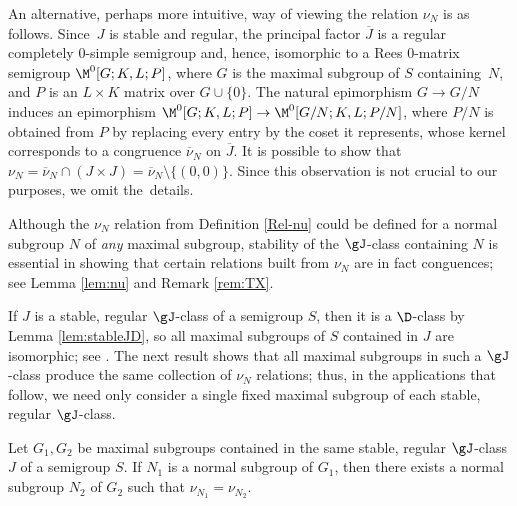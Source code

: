 An alternative, perhaps more intuitive, way of viewing the relation $\nu_N$ is
as follows.
Since~$J$ is stable and regular, the principal factor $\overline{J}$ is a regular
completely $0$-simple semigroup and, hence, isomorphic to a Rees $0$-matrix
semigroup $\M^0[G;K,L; P]$, where $G$ is the maximal subgroup of $S$ containing~$N$, and $P$ is an $L\times K$ matrix over $G\cup\{0\}$.  The natural
epimorphism $G\rightarrow G/N$ induces an epimorphism ${\M^0[G;K,L;P]\rightarrow
\M^0[G/N;K,L;P/N]}$, where $P/N$ is obtained from $P$ by replacing every entry by
the coset it represents, whose kernel corresponds to a congruence
$\overline{\nu}_N$ on $\overline{J}$.  It is possible to show that
$\nu_N=\overline{\nu}_N\cap(J\times J)=\overline{\nu}_N\setminus\{(0,0)\}$.  Since this observation is not crucial to our purposes, we omit the~details.

Although the $\nu_N$ relation from Definition \ref{Rel-nu} could be defined for a normal subgroup $N$ of \emph{any} maximal subgroup, stability of the $\gJ$-class containing $N$ is essential in showing that certain relations built from $\nu_N$ are in fact conguences; see Lemma \ref{lem:nu} and Remark \ref{rem:TX}.

%
If $J$ is a stable, regular $\gJ$-class of a semigroup $S$, then it is a $\D$-class by Lemma \ref{lem:stableJD}, so all maximal subgroups of $S$ contained in $J$ are isomorphic; see \cite[Proposition 2.3.6]{Howie}.  The next result shows that all maximal subgroups in such a $\gJ$-class produce the same collection of $\nu_N$ relations; thus, in the applications that follow, we need only consider a single fixed maximal subgroup of each stable, regular $\gJ$-class.

\begin{lemma}\label{lem:G1G2}
Let $G_1,G_2$ be maximal subgroups contained in the same stable, regular $\gJ$-class $J$ of a semigroup $S$.  If $N_1$ is a normal subgroup of $G_1$, then there exists a normal subgroup $N_2$ of $G_2$ such that $\nu_{N_1}=\nu_{N_2}$.
\end{lemma}

